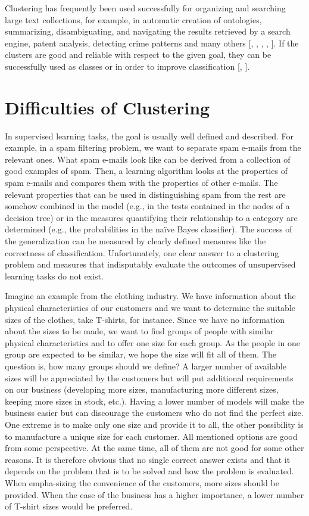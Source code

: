 Clustering has frequently been used successfully for organizing and searching large text collections, for example, in automatic creation of ontologies, summarizing, disambiguating, and navigating the results retrieved by a search engine, patent analysis, detecting crime patterns and many others [\cite{ref61}, \cite{ref70}, \cite{ref262}, \cite{ref108}, 
\cite{ref40}]. If the clusters are good and reliable with respect to the given goal, they can be successfully used as classes or in order to improve classification [\cite{ref84}, \cite{ref158}].

\section{Difficulties of Clustering}
In supervised learning tasks, the goal is usually well defined and described. For example, in a spam filtering problem, we want to separate spam e-mails from the relevant ones. What spam e-mails look like can be derived from a collection of good examples of spam. Then, a learning algorithm looks at the properties of spam e-mails and compares them with the properties of other e-mails. The relevant properties that can be used in distinguishing spam from the rest are somehow combined in the model (e.g., in the tests contained in the nodes of a decision tree) or in the measures quantifying their relationship to a category are determined (e.g., the probabilities in the naïve Bayes classifier). The success of the generalization can be measured by clearly defined measures like the correctness of classification. Unfortunately, one clear answer to a clustering problem and measures that indisputably evaluate the outcomes of unsupervised learning tasks do not exist.

Imagine an example from the clothing industry. We have information about the physical characteristics of our customers and we want to determine the suitable sizes of the clothes, take T-shirts, for instance. Since we have no information about the sizes to be made, we want to find groups of people with similar physical characteristics and to offer one size for each group. As the people in one group are expected to be similar, we hope the size will fit all of them. The question is, how many groups should we define? A larger number of available sizes will be appreciated by the customers but will put additional requirements on our business (developing more sizes, manufacturing more different sizes, keeping more sizes in stock, etc.). Having a lower number of models will make the business easier but can discourage the customers who do not find the perfect size. One extreme is to make only one size and provide it to all, the other possibility is to manufacture a unique size for each customer. All mentioned options are good from some perspective. At the same time, all of them are not good for some other reasons. It is therefore obvious that no single correct answer exists and that it depends on the problem that is to be solved and how the problem is evaluated. When empha-sizing the convenience of the customers, more sizes should be provided. When the ease of the business has a higher importance, a lower number of T-shirt sizes would be preferred.


